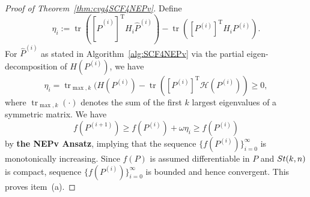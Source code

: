 \documentclass[11pt]{article}
\def\scrH{\mathscr{H}}
\def\what{\widehat}
\newcommand\STM[2]{{\rm St}(#1,#2)}
\DeclareMathOperator{\tr}{tr}
\DeclareMathOperator{\T}{T}
\theoremstyle{definition}
\numberwithin{equation}{section}
\begin{document}
\begin{proof}[Proof of Theorem~\ref{thm:cvg4SCF4NEPv}]
Define
\begin{equation}\label{eq:cvg4SCF4NEPv-0}
\eta_i:=\tr([\what P^{(i)}]^{\T}H_i\what P^{(i)})-\tr([P^{(i)}]^{\T}H_i P^{(i)}).
\end{equation}
For $\what P^{(i)}$ as stated in Algorithm~\ref{alg:SCF4NEPv} via the partial eigen-decomposition of $H(P^{(i)})$, we have
\begin{equation} \label{eq:cvg4SCF4NEPv-0'}
\eta_i=\tr_{\max,k}(H(P^{(i)})-\tr([P^{(i)}]^{\T}\scrH(P^{(i)}))\ge 0,
\end{equation}
where $\tr_{\max,k}(\cdot)$ denotes the sum of the first $k$ largest eigenvalues of a symmetric matrix.
We have
\begin{equation}\label{eq:cvg4SCF4NEPv:obj}
f(P^{(i+1)})\ge f(P^{(i)})+\omega\eta_i\ge f(P^{(i)})
\end{equation}
by {\bf the NEPv Ansatz}, implying that
the sequence $\{f(P^{(i)})\}_{i=0}^{\infty}$ is monotonically increasing.
Since $f(P)$ is assumed differentiable in $P$ and $\STM{k}{n}$ is compact,
sequence $\{f(P^{(i)})\}_{i=0}^{\infty}$ is bounded and hence convergent. This proves item~(a).




\end{proof}
\end{document}
